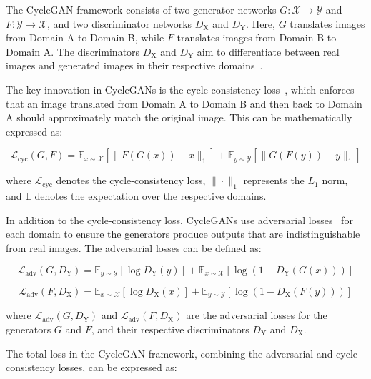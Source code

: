 \documentclass[12pt,DIV14,BCOR12mm,a4paper,footinclude=false,headinclude,parskip=half-,twoside,openright,cleardoublepage=empty,toc=index,bibliography=totoc,listof=totoc]{scrreprt}
\numberwithin{equation}{chapter}
\begin{document}
The CycleGAN framework consists of two generator networks \(G: \mathcal{X} \to \mathcal{Y}\) and \(F: \mathcal{Y} \to \mathcal{X}\), and two discriminator networks \(D_{\text{X}}\) and \(D_{\text{Y}}\). Here, \(G\) translates images from Domain A to Domain B, while \(F\) translates images from Domain B to Domain A. The discriminators \(D_{\text{X}}\) and \(D_{\text{Y}}\) aim to differentiate between real images and generated images in their respective domains~\cite{almahairi2018augmented, zhu2017unpaired}.

The key innovation in CycleGANs is the cycle-consistency loss~\cite{dwibedi2019temporal, zhu2017unpaired}, which enforces that an image translated from Domain A to Domain B and then back to Domain A should approximately match the original image. This can be mathematically expressed as:

\begin{equation}
\mathcal{L}_{\text{cyc}}(G, F) = \mathbb{E}_{x \sim \mathcal{X}}[\|F(G(x)) - x\|_1] + \mathbb{E}_{y \sim \mathcal{Y}}[\|G(F(y)) - y\|_1]
\end{equation}

where \(\mathcal{L}_{\text{cyc}}\) denotes the cycle-consistency loss, \(\| \cdot \|_1\) represents the \(L_1\) norm, and \(\mathbb{E}\) denotes the expectation over the respective domains.

In addition to the cycle-consistency loss, CycleGANs use adversarial losses~\cite{dong2019towards} for each domain to ensure the generators produce outputs that are indistinguishable from real images. The adversarial losses can be defined as:

\begin{equation}
\mathcal{L}_{\text{adv}}(G, D_{\text{Y}}) = \mathbb{E}_{y \sim \mathcal{Y}}[\log D_{\text{Y}}(y)] + \mathbb{E}_{x \sim \mathcal{X}}[\log(1 - D_{\text{Y}}(G(x)))]
\end{equation}

\begin{equation}
\mathcal{L}_{\text{adv}}(F, D_{\text{X}}) = \mathbb{E}_{x \sim \mathcal{X}}[\log D_{\text{X}}(x)] + \mathbb{E}_{y \sim \mathcal{Y}}[\log(1 - D_{\text{X}}(F(y)))]
\end{equation}

where \(\mathcal{L}_{\text{adv}}(G, D_{\text{Y}})\) and \(\mathcal{L}_{\text{adv}}(F, D_{\text{X}})\) are the adversarial losses for the generators \(G\) and \(F\), and their respective discriminators \(D_{\text{Y}}\) and \(D_{\text{X}}\).

The total loss in the CycleGAN framework, combining the adversarial and cycle-consistency losses, can be expressed as:
\end{document}
